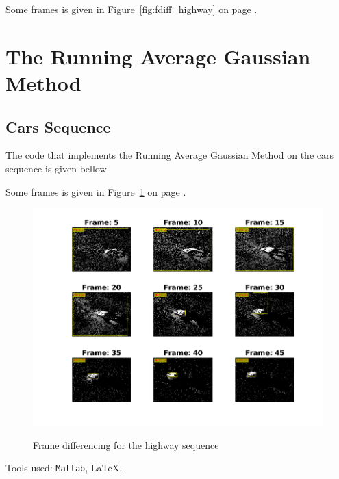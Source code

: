 \documentclass[a4paper,12pt]{article}
\begin{document}
\vspace{10pt}

\vspace{30pt}

Some frames is given in Figure~\ref{fig:fdiff_highway} on page \pageref{fig:fdiff_highway}.

\section{The Running Average Gaussian Method}

\subsection{Cars Sequence}

The code that implements the Running Average Gaussian Method on the cars sequence is given bellow 

\vspace{10pt}

\vspace{30pt}

Some frames is given in Figure~\ref{fig:a3_gaussian_cars} on page \pageref{fig:a3_gaussian_cars}.
\centering
\begin{figure}[Ht]
\includegraphics{../Videos/a3_gaussian.png}
\label{fig:a3_gaussian_cars}
\caption{Frame differencing for the highway sequence}
\end{figure}
 

\vfill
\noindent Tools used: \texttt{Matlab}, \LaTeX{}.
\end{document}
